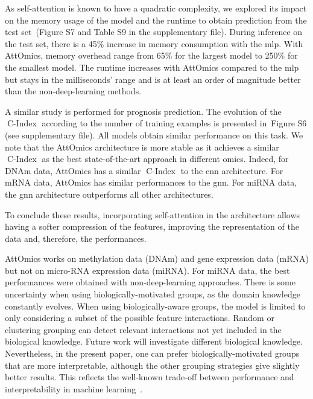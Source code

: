 \documentclass[../main.tex]{subfiles}
\begin{document}
	 As self-attention is known to have a quadratic complexity, we explored its impact on the memory usage of the model and the runtime to obtain prediction from the test set~(Figure S7 and Table S9 in the supplementary file).
	 During inference on the test set, there is a 45\% increase in memory consumption with the \gls{mlp}.
	 With AttOmics, memory overhead range from 65\% for the largest model to 250\% for the smallest model.
	 The runtime increases with AttOmics compared to the \gls{mlp} but stays in the milliseconds' range and is at least an order of magnitude better than the non-deep-learning methods.


	 A similar study is performed for prognosis prediction.
	 The evolution of the $\operatorname{C-Index}$ according to the number of training examples is presented in~Figure S6 (see supplementary file).
	 All models obtain similar performance on this task.
	 We note that the AttOmics architecture is more stable as it achieves a similar $\operatorname{C-Index}$ as the best state-of-the-art approach in different omics.
	 Indeed, for DNAm data, AttOmics has a similar $\operatorname{C-Index}$ to the \gls{cnn} architecture. For mRNA data, AttOmics has similar performances to the \gls{gnn}.
	 For miRNA data, the \gls{gnn} architecture outperforms all other architectures.

	 To conclude these results, incorporating self-attention in the architecture allows having a softer compression of the features, improving the representation of the data and, therefore, the performances.

	 AttOmics works on methylation data (DNAm) and gene expression data (mRNA) but not on micro-RNA expression data (miRNA).
	 For miRNA data, the best performances were obtained with non-deep-learning approaches.
	 There is some uncertainty when using biologically-motivated groups, as the domain knowledge constantly evolves.
	 When using biologically-aware groups, the model is limited to only considering a subset of the possible feature interactions.
	 Random or clustering grouping can detect relevant interactions not yet included in the biological knowledge.
	 Future work will investigate different biological knowledge.
	 Nevertheless, in the present paper, one can prefer biologically-motivated groups that are more interpretable, although the other grouping strategies give slightly better results.
	 This reflects the well-known trade-off between performance and interpretability in machine learning~\cite{Linardatos2021_ExplainableAI}.
\end{document}
